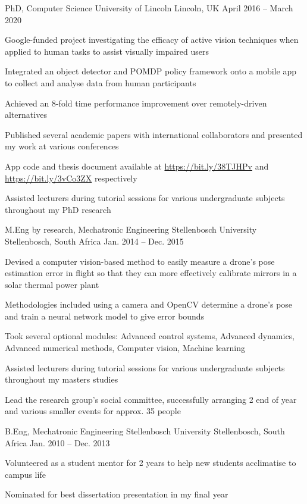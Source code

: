 \documentclass[11pt,a4paper]{awesome-cv}        %
\begin{document}
\begin{cventries}
  \cventry
  {PhD, Computer Science}
  {University of Lincoln}
  {Lincoln, UK}
  {April 2016 -- March 2020}
  {
    \begin{cvitems}
      \item Google-funded project investigating the efficacy of active vision techniques when applied to human tasks to assist visually impaired users
      \item Integrated an object detector and POMDP policy framework onto a mobile app to collect and analyse data from human participants
      \item Achieved an 8-fold time performance improvement over remotely-driven alternatives
      \item Published several academic papers with international collaborators and presented my work at various conferences
      \item App code and thesis document available at \url{https://bit.ly/38TJHPv} and \url{https://bit.ly/3vCo3ZX} respectively
      \item Assisted lecturers during tutorial sessions for various undergraduate subjects throughout my PhD research
    \end{cvitems}
  }
  \cventry
  {M.Eng by research, Mechatronic Engineering}
  {Stellenbosch University}
  {Stellenbosch, South Africa}
  {Jan. 2014 -- Dec. 2015}
  {
    \begin{cvitems}
      \item Devised a computer vision-based method to easily measure a drone's pose estimation error in flight so that they can more effectively calibrate mirrors in a solar thermal power plant
      \item Methodologies included using a camera and OpenCV determine a drone's pose and train a neural network model to give error bounds
      \item Took several optional modules: Advanced control systems, Advanced dynamics, Advanced numerical methods, Computer vision, Machine learning
      \item Assisted lecturers during tutorial sessions for various undergraduate subjects throughout my masters studies
      \item Lead the research  group's social committee, successfully arranging 2 end of year and various smaller events for approx. 35 people
    \end{cvitems}
  }
  \cventry
  {B.Eng, Mechatronic Engineering}
  {Stellenbosch University}
  {Stellenbosch, South Africa}
  {Jan. 2010 -- Dec. 2013}
  {
    \begin{cvitems}
      \item Volunteered as a student mentor for 2 years to help new students acclimatise to campus life
      \item Nominated for best dissertation presentation in my final year
    \end{cvitems}
  }  
\end{cventries}
\end{document}
